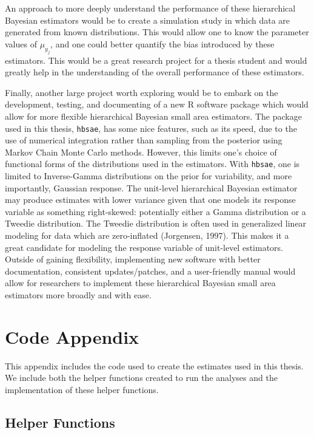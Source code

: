 \documentclass[12pt,twoside]{reedthesis}
\begin{document}
An approach to more deeply understand the performance of these hierarchical Bayesian estimators would be to create a simulation study in which data are generated from known distributions. This would allow one to know the parameter values of \(\mu_{y_j}\), and one could better quantify the bias introduced by these estimators. This would be a great research project for a thesis student and would greatly help in the understanding of the overall performance of these estimators.

Finally, another large project worth exploring would be to embark on the development, testing, and documenting of a new R software package which would allow for more flexible hierarchical Bayesian small area estimators. The package used in this thesis, \texttt{hbsae}, has some nice features, such as its speed, due to the use of numerical integration rather than sampling from the posterior using Markov Chain Monte Carlo methods. However, this limits one's choice of functional forms of the distributions used in the estimators. With \texttt{hbsae}, one is limited to Inverse-Gamma distributions on the prior for variability, and more importantly, Gaussian response. The unit-level hierarchical Bayesian estimator may produce estimates with lower variance given that one models its response variable as something right-skewed: potentially either a Gamma distribution or a Tweedie distribution. The Tweedie distribution is often used in generalized linear modeling for data which are zero-inflated (Jorgensen, 1997). This makes it a great candidate for modeling the response variable of unit-level estimators. Outside of gaining flexibility, implementing new software with better documentation, consistent updates/patches, and a user-friendly manual would allow for researchers to implement these hierarchical Bayesian small area estimators more broadly and with ease.

\appendix

\hypertarget{code-appendix}{%
\chapter{Code Appendix}\label{code-appendix}}

This appendix includes the code used to create the estimates used in this thesis. We include both the helper functions created to run the analyses and the implementation of these helper functions.

\hypertarget{helper-functions}{%
\section{Helper Functions}\label{helper-functions}}
\end{document}
